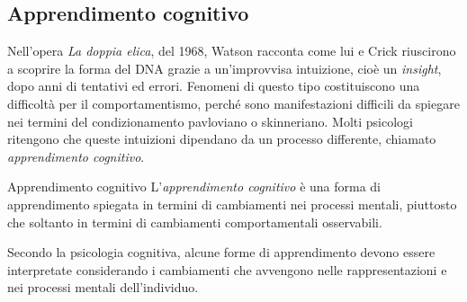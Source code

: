 \documentclass[a4paper]{article}
\begin{document}
\subsection{Apprendimento cognitivo}
Nell'opera \emph{La doppia elica}, del 1968, Watson racconta come lui e Crick riuscirono a scoprire la forma del DNA grazie a un'improvvisa intuizione, cioè un \emph{insight}, dopo anni di tentativi ed errori.
Fenomeni di questo tipo costituiscono una difficoltà per il comportamentismo, perché sono manifestazioni difficili da spiegare nei termini del condizionamento pavloviano o skinneriano. Molti psicologi ritengono che queste intuizioni dipendano da un processo differente, chiamato \emph{apprendimento cognitivo}.
\begin{snippetdefinition}{Apprendimento cognitivo}
    L'\emph{apprendimento cognitivo} è una forma di apprendimento spiegata in termini di cambiamenti nei processi mentali, piuttosto che soltanto in termini di cambiamenti comportamentali osservabili.
\end{snippetdefinition}
Secondo la psicologia cognitiva, alcune forme di apprendimento devono essere interpretate considerando i cambiamenti che avvengono nelle rappresentazioni e nei processi mentali dell'individuo.
\end{document}
